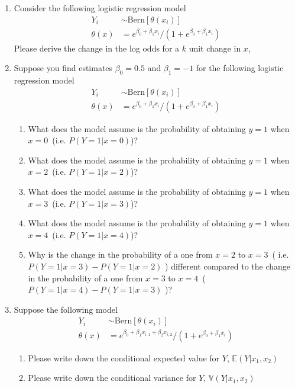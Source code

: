 \begin{enumerate}
    \item Consider the following logistic regression model 
    \begin{align}
        Y_{i} & \sim  \text{Bern}[\theta(x_{i})] \\ 
              \theta(x) &= e^{\beta_{0} + \beta_{1}x_{i}} \Big / (1+e^{\beta_{0} + \beta_{1}x_{i}})
    \end{align}
    Please derive the change in the log odds for a $k$ unit change in $x$,
    
    \item Suppose you find estimates $\beta_{0} = 0.5$ and $\beta_{1} = -1$ for the following logistic regression model 
        \begin{align}
        Y_{i} & \sim  \text{Bern}[\theta(x_{i})] \\ 
              \theta(x) &= e^{\beta_{0} + \beta_{1}x_{i}} \Big / (1+e^{\beta_{0} + \beta_{1}x_{i}})
        \end{align}
        \begin{enumerate}
            \item What does the model assume is the probability of obtaining $y=1$ when $x=0$~(i.e. $P(Y=1 | x=0)$)? 
            
            \item What does the model assume is the probability of obtaining $y=1$ when $x=2$~(i.e. $P(Y=1 | x=2)$)? 
        
            \item What does the model assume is the probability of obtaining $y=1$ when $x=3$~(i.e. $P(Y=1 | x=3)$)? 
            
            \item What does the model assume is the probability of obtaining $y=1$ when $x=4$~(i.e. $P(Y=1 | x=4)$)? 
            
            \item Why is the change in the probability of a one from $x=2$ to $x=3$~( i.e. $P(Y=1 | x=3) - P(Y=1 | x=2)$ ) different compared to the change in the probability of a one from $x=3$ to $x=4$~($P(Y=1 | x=4) - P(Y=1 | x=3)$ )?
        \end{enumerate}
    \item Suppose the following model
    \begin{align}
        Y_{i} & \sim  \text{Bern}[\theta(x_{i})] \\ 
              \theta(x) &= e^{\beta_{0} + \beta_{1}x_{i,1} +\beta_{2}x_{i,2} } \Big / (1+e^{\beta_{0} + \beta_{1}x_{i}})
        \end{align}
    \begin{enumerate}
        \item Please write down the conditional expected value for $Y$, $\mathbb{E}(Y | x_{1}, x_{2})$
        \item Please write down the conditional variance for $Y$, $\mathbb{V}(Y | x_{1}, x_{2})$
    \end{enumerate}
    

\end{enumerate}
